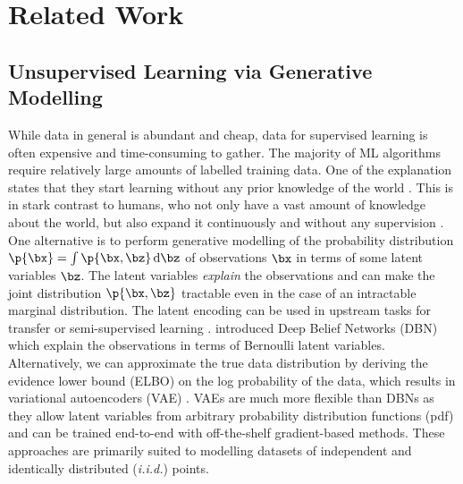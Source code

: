 \section{Related Work}
\label{sec:lit}



%
%   
    \subsection{Unsupervised Learning via Generative Modelling}
       While data in general is abundant and cheap, data for supervised learning is often expensive and time-consuming to gather. The majority of ML algorithms require relatively large amounts of labelled training data. One of the explanation states that they start learning without any prior knowledge of the world \addref. This is in stark contrast to humans, who not only have a vast amount of knowledge about the world, but also expand it continuously and without any supervision \citep{Friston2009guide}. One alternative is to perform generative modelling of the probability distribution $\p{\bx} = \int \p{\bx, \bz} \dint \bz$ of observations $\bx$ in terms of some latent variables $\bz$. The latent variables \emph{explain} the observations and can make the joint distribution $\p{\bx, \bz}$ tractable even in the case of an intractable marginal distribution. The latent encoding can be used in upstream tasks \eg for transfer or semi-supervised learning \citep{Pan2010}. \cite{Hinton2006dbn} introduced Deep Belief Networks (DBN) which explain the observations in terms of Bernoulli latent variables. Alternatively, we can approximate the true data distribution by deriving the evidence lower bound (ELBO) on the log probability of the data, which results in variational autoencoders (VAE) \citep{Kingma2013,Rezende2014}. VAEs are much more flexible than DBNs as they allow latent variables from arbitrary probability distribution functions (pdf) and can be trained end-to-end with off-the-shelf gradient-based methods. These approaches are primarily suited to modelling datasets of independent and identically distributed (\emph{i.i.d.}) points.
%
%
